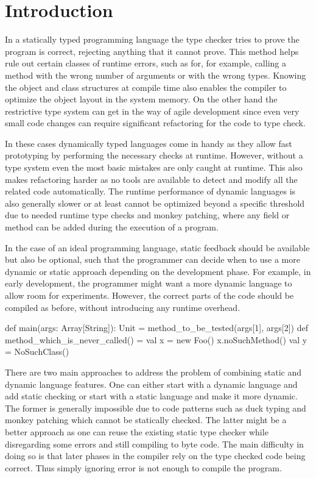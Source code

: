  \section{Introduction}

 In a statically typed programming language the type checker tries to prove the program is correct, rejecting anything that it cannot prove. This method helps rule out certain classes of runtime errors, such as for, for example, calling a method with the wrong number of arguments or with the wrong types. Knowing the object and class structures at compile time also enables the compiler to optimize the object layout in the system memory. On the other hand the restrictive type system can get in the way of agile development since even very small code changes can require significant refactoring for the code to type check.

 In these cases dynamically typed languages come in handy as they allow fast prototyping by performing the necessary checks at runtime. However, without a type system even the most basic mistakes are only caught at runtime. This also makes refactoring harder as no tools are available to detect and modify all the related code automatically. The runtime performance of dynamic languages is also generally slower or at least cannot be optimized beyond a specific threshold due to needed runtime type checks and monkey patching, where any field or method can be added during the execution of a program. 

  In the case of an ideal programming language, static feedback should be available but also be optional, such that the programmer can decide when to use a more dynamic or static approach depending on the development phase. For example, in early development, the programmer might want a more dynamic language to allow room for experiments. However, the correct parts of the code should be compiled as before, without introducing any runtime overhead.
\begin{lstlisting-nobreak}
def main(args: Array[String]): Unit = {
    method_to_be_tested(args[1], args[2])
}
def method_which_is_never_called() = {
    val x = new Foo()
    x.noSuchMethod()
    val y = NoSuchClass()
}
\end{lstlisting-nobreak}

  There are two main approaches to address the problem of combining static and dynamic language features. One can either start with a dynamic language and add static checking or start with a static language and make it more dynamic. The former is generally impossible due to code patterns such as duck typing and monkey patching which cannot be statically checked. The latter might be a better approach as one can reuse the existing static type checker while disregarding some errors and still compiling to byte code. The main difficulty in doing so is that later phases in the compiler rely on the type checked code being correct. Thus simply ignoring error is not enough to compile the program.

